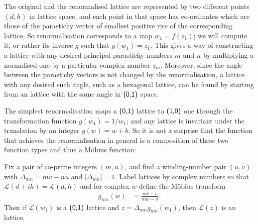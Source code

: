 The original and the renormalised lattice are represented by two different points $(d,h)$ in lattice space, and each point in that space has co-ordinates which are those of the parastichy vector of smallest positive rise of the corresponding lattice. So renormalisation corresponds to a map $w_1=f(z_1)$; we will compute it, or rather its inverse $g$ such that $g(w_1)=z_1$. This gives a way of constructing a lattice with any desired principal parastichy numbers $m$ and $n$ by multiplying a normalised one by a particular complex number $z_m$. Moreover, since the angle between the parastichy vectors is not changed by the renormalisation, a lattice with any desired such angle, such as a hexagonal lattice, can be found by starting from an lattice with the same angle in $\textsf{(0,1)}$ space. 

The simplest renormalisation maps a $\textsf{(0,1)}$ lattice to $\textsf{(1,0)}$ one through the transformation  function $g(w_1)=1/w_1$; and any lattice is invariant under the translation by an integer $g(w)=w+b$. So it is not a surprise that 
 the function that achieves the renormalisation in general is a composition of these two function types and thus a M\"obius function:
\begin{theorem}
		\label{thm:renormalization}
	Fix a pair of co-prime integers $(m,n)$,  and find a winding-number pair $(u,v)$ with  $\Delta_{mn}=mv-nu$ and $|\Delta_{mn}|=1$. Label lattices by complex numbers so that  $\mathcal{L}(d+ih)=\mathcal{L}(d,h)$ and for complex $w$ define the M\"obius transform
	\begin{align}
		\label{eq:gDefinition}
		g_{mn}(w)& = \frac{ u   w- v}{ m  w   -n}.
	\end{align}
Then if	$\mathcal{L}(w_1)$ is a $\textsf{(0,1)}$ lattice and $z= \Delta_{mn} g_{mn}(w_1)$,   then $\mathcal{L}(z)$ is an  lattice.  
\end{theorem}

